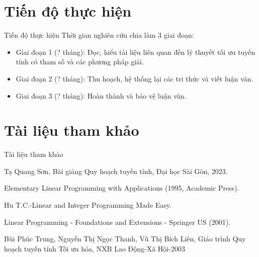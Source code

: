 \documentclass{beamer}
\begin{document}
\section{Tiến độ thực hiện}
\begin{frame}{Tiến độ thực hiện}
Thời gian nghiên cứu chia làm 3 giai đoạn:
\begin{itemize}
\item Giai đoạn 1 (? tháng): Đọc, hiểu tài liệu liên quan đến lý thuyết tối ưu tuyến tính có tham số và các phương pháp giải.
\item Giai đoạn 2 (? tháng): Thu hoạch, hệ thống lại các tri thức và viết luận văn.
\item Giai đoạn 3 (? tháng): Hoàn thành và bảo vệ luận văn.
\end{itemize}
\end{frame}


\section{Tài liệu tham khảo}

\begin{frame}{Tài liệu tham khảo}
\begin{thebibliography}{xxx}
   Tạ Quang Sơn, Bài giảng Quy hoạch tuyến tính, Đại học Sài Gòn, 2023.

 Elementary Linear Programming with Applications (1995, Academic Press).

 Hu T.C.-Linear and Integer Programming Made Easy.

 Linear Programming - Foundations and Extensions - Springer US (2001).

Bùi Phúc Trung, Nguyễn Thị Ngọc Thanh, Vũ Thị Bích Liên, Giáo trình Quy hoạch tuyến tính Tối ưu hóa, NXB Lao Động-Xã Hội-2003

\end{thebibliography}
\end{frame}

\begin{frame}
\begin{block}{}
\medskip
\center{\huge \it \textcolor[rgb]{0.50,0.30,1.0}{Cảm ơn quý thầy cô và các anh chị đã quan tâm theo dõi!}}
\medskip
\end{block}	
\end{frame}
\end{document}
